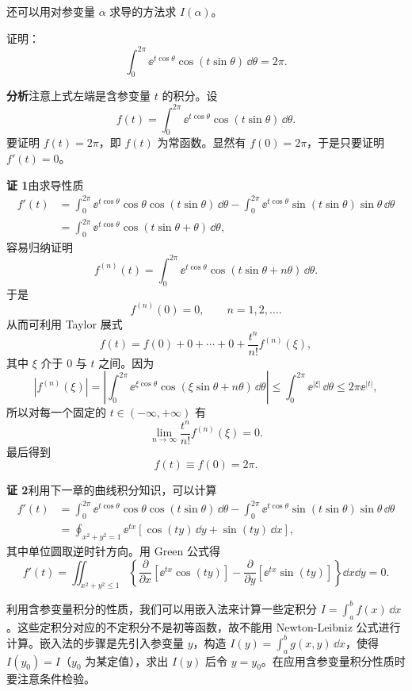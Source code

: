 \begin{xremark}
还可以用对参变量 $\alpha$ 求导的方法求 $I(\alpha)$。
\end{xremark}

\begin{xexample}[23.1.5]
证明：
\[
  \int_0^{2\pi}\ee^{t\cos\theta}\cos(t\sin\theta)\,\dd\theta=2\pi.
\]
\end{xexample}

\textbf{分析}\quad 注意上式左端是含参变量 $t$ 的积分。设
\[
  f(t)=\int_0^{2\pi}\ee^{t\cos\theta}\cos(t\sin\theta)\,\dd\theta.
\]
要证明 $f(t)=2\pi$，即 $f(t)$ 为常函数。显然有 $f(0)=2\pi$，于是只要证明 $f'(t)=0$。

\textbf{证 1}\quad 由求导性质
\[
\begin{aligned}
  f'(t)
  &=\int_0^{2\pi}\ee^{t\cos\theta}\cos\theta\cos(t\sin\theta)\,\dd\theta
    -\int_0^{2\pi}\ee^{t\cos\theta}\sin(t\sin\theta)\sin\theta\,\dd\theta\\
  &=\int_0^{2\pi}\ee^{t\cos\theta}\cos(t\sin\theta+\theta)\,\dd\theta,
\end{aligned}
\]
容易归纳证明
\[
  f^{(n)}(t)=\int_0^{2\pi}\ee^{t\cos\theta}\cos(t\sin\theta+n\theta)\,\dd\theta.
\]
于是
\[
  f^{(n)}(0)=0,\qquad n=1,2,\ldots.
\]
从而可利用 Taylor 展式
\[
  f(t)=f(0)+0+\cdots+0+\frac{t^n}{n!}f^{(n)}(\xi),
\]
其中 $\xi$ 介于 $0$ 与 $t$ 之间。因为
\[
  |f^{(n)}(\xi)|
  =\left|\int_0^{2\pi}\ee^{\xi\cos\theta}\cos(\xi\sin\theta+n\theta)\,\dd\theta\right|
  \leqslant\int_0^{2\pi}\ee^{|\xi|}\,\dd\theta
  \leqslant2\pi\ee^{|t|},
\]
所以对每一个固定的 $t\in(-\infty,+\infty)$ 有
\[
  \lim_{n\to\infty}\frac{t^n}{n!}f^{(n)}(\xi)=0.
\]
最后得到
\[
  f(t)\equiv f(0)=2\pi.
\]

\textbf{证 2}\quad 利用下一章的曲线积分知识，可以计算
\[
\begin{aligned}
  f'(t)&=\int_0^{2\pi}\ee^{t\cos\theta}\cos\theta\cos(t\sin\theta)\,\dd\theta
  -\int_0^{2\pi}\ee^{t\cos\theta}\sin(t\sin\theta)\sin\theta\,\dd\theta\\
  &=\oint_{x^2+y^2=1}\ee^{tx}[\cos(ty)\,\dd y+\sin(ty)\,\dd x],
\end{aligned}
\]
其中单位圆取逆时针方向。用 Green 公式得
\[
  f'(t)=\iint_{x^2+y^2\leqslant1}\left\{\frac{\partial}{\partial x}[\ee^{tx}\cos(ty)]-\frac{\partial}{\partial y}[\ee^{tx}\sin(ty)]\right\}\dd x\dd y=0.
\]

利用含参变量积分的性质，我们可以用嵌入法来计算一些定积分 $I=\int_a^b f(x)\,\dd x$。这些定积分对应的不定积分不是初等函数，故不能用 Newton-Leibniz 公式进行计算。嵌入法的步骤是先引入参变量 $y$，构造 $I(y)=\int_a^b g(x,y)\,\dd x$，使得 $I(y_0)=I$（$y_0$ 为某定值），求出 $I(y)$ 后令 $y=y_0$。在应用含参变量积分性质时要注意条件检验。

